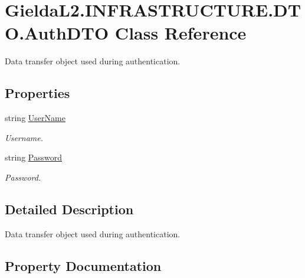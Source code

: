 \hypertarget{class_gielda_l2_1_1_i_n_f_r_a_s_t_r_u_c_t_u_r_e_1_1_d_t_o_1_1_auth_d_t_o}{}\section{Gielda\+L2.\+I\+N\+F\+R\+A\+S\+T\+R\+U\+C\+T\+U\+R\+E.\+D\+T\+O.\+Auth\+D\+TO Class Reference}
\label{class_gielda_l2_1_1_i_n_f_r_a_s_t_r_u_c_t_u_r_e_1_1_d_t_o_1_1_auth_d_t_o}


Data transfer object used during authentication.  


\subsection*{Properties}
\begin{DoxyCompactItemize}
\item 
string \mbox{\hyperlink{class_gielda_l2_1_1_i_n_f_r_a_s_t_r_u_c_t_u_r_e_1_1_d_t_o_1_1_auth_d_t_o_a34aca8e8a62a54635e0241833523a94a}{User\+Name}}
\begin{DoxyCompactList}\small\item\em Username. \end{DoxyCompactList}\item 
string \mbox{\hyperlink{class_gielda_l2_1_1_i_n_f_r_a_s_t_r_u_c_t_u_r_e_1_1_d_t_o_1_1_auth_d_t_o_aeaa643ae6f060ce554ac23680723d90b}{Password}}
\begin{DoxyCompactList}\small\item\em Password. \end{DoxyCompactList}\end{DoxyCompactItemize}


\subsection{Detailed Description}
Data transfer object used during authentication. 



\subsection{Property Documentation}
\mbox{\label{class_gielda_l2_1_1_i_n_f_r_a_s_t_r_u_c_t_u_r_e_1_1_d_t_o_1_1_auth_d_t_o_aeaa643ae6f060ce554ac23680723d90b}} 
